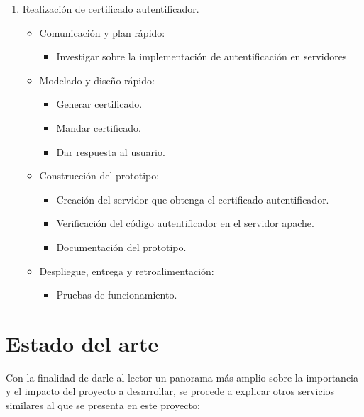 \documentclass[12pt, a4paper, titlepage]{report}
\begin{document}
\begin{enumerate}
            
            \item Realización de certificado autentificador.
            \begin{itemize}
                \item Comunicación y plan rápido:
                \begin{itemize}
                    \item  Investigar sobre la implementación de autentificación en servidores 
                \end{itemize}
                \item Modelado y diseño rápido:
                \begin{itemize}
                    \item Generar certificado.
                    \item Mandar certificado.
                    \item Dar respuesta al usuario.
                \end{itemize}
                \item Construcción del prototipo:
                \begin{itemize}
                    \item Creación del servidor que obtenga el certificado autentificador.
                    \item Verificación del código autentificador en el servidor apache.
                    \item Documentación del prototipo. 
                \end{itemize}
                \item Despliegue, entrega y retroalimentación:
                \begin{itemize}
                    \item Pruebas de funcionamiento.
                \end{itemize}
            \end{itemize}
        \end{enumerate}
	    
	    
	\chapter{\textcolor{azulescom}{Estado del arte}}
    Con la finalidad de darle al lector un panorama más amplio sobre la importancia y el impacto del proyecto a desarrollar, se procede a explicar otros servicios similares al que se presenta en este proyecto:\\
    
\end{document}

